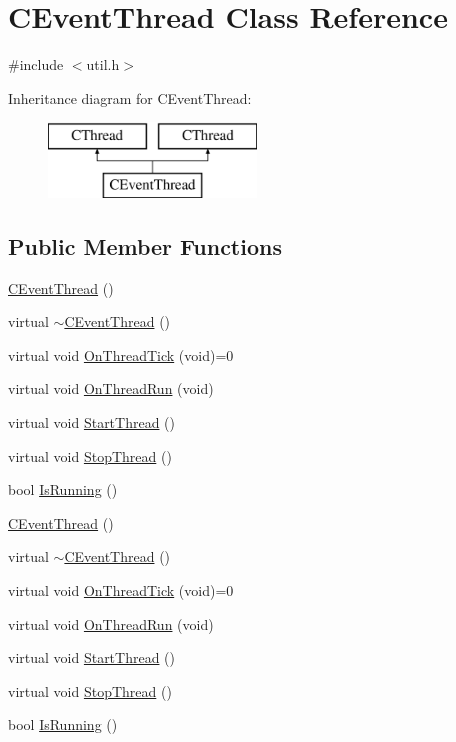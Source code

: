 \hypertarget{class_c_event_thread}{}\section{C\+Event\+Thread Class Reference}
\label{class_c_event_thread}


{\ttfamily \#include $<$util.\+h$>$}

Inheritance diagram for C\+Event\+Thread\+:\begin{figure}[H]
\begin{center}
\leavevmode
\includegraphics[height=2.000000cm]{class_c_event_thread}
\end{center}
\end{figure}
\subsection*{Public Member Functions}
\begin{DoxyCompactItemize}
\item 
\hyperlink{class_c_event_thread_a5e0298aac9de25308f716580956598bd}{C\+Event\+Thread} ()
\item 
virtual \hyperlink{class_c_event_thread_a6b3eda26b65a79d331dd472295f65694}{$\sim$\+C\+Event\+Thread} ()
\item 
virtual void \hyperlink{class_c_event_thread_a2b8cce08c458a8cb43365b53a121ee4d}{On\+Thread\+Tick} (void)=0
\item 
virtual void \hyperlink{class_c_event_thread_a6ad44cd6ef00ba945d4e7ebb46a97448}{On\+Thread\+Run} (void)
\item 
virtual void \hyperlink{class_c_event_thread_a685f655956cf2e3e334e44b8ae08a995}{Start\+Thread} ()
\item 
virtual void \hyperlink{class_c_event_thread_ac04c1860a4c12357135f8319be980168}{Stop\+Thread} ()
\item 
bool \hyperlink{class_c_event_thread_a927f220bf136a8479f0ca71f1ddce3c2}{Is\+Running} ()
\item 
\hyperlink{class_c_event_thread_a5e0298aac9de25308f716580956598bd}{C\+Event\+Thread} ()
\item 
virtual \hyperlink{class_c_event_thread_a9dd7daad6f6d4fee87f4dde93d346306}{$\sim$\+C\+Event\+Thread} ()
\item 
virtual void \hyperlink{class_c_event_thread_a2b8cce08c458a8cb43365b53a121ee4d}{On\+Thread\+Tick} (void)=0
\item 
virtual void \hyperlink{class_c_event_thread_a0efc3d406cb98907956d4eb10cab0505}{On\+Thread\+Run} (void)
\item 
virtual void \hyperlink{class_c_event_thread_aae9853b983731e88714ccf39fae0286f}{Start\+Thread} ()
\item 
virtual void \hyperlink{class_c_event_thread_a3fd791e796b41a79f9f23a8086dd278b}{Stop\+Thread} ()
\item 
bool \hyperlink{class_c_event_thread_a927f220bf136a8479f0ca71f1ddce3c2}{Is\+Running} ()
\end{DoxyCompactItemize}
